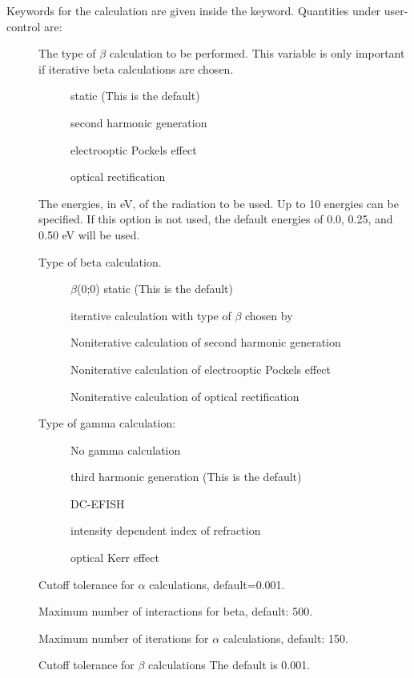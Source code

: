 Keywords for the  calculation are given inside the 
keyword.  Quantities under user-control are:
\begin{description}
\item[] The type of $\beta$ calculation to be performed.  
This variable is only important if iterative beta calculations are chosen.
\begin{description}
\item[] static (This is the default)
\item[] second harmonic generation
\item[] electrooptic Pockels effect
\item[] optical rectification
\end{description}
\item[] The energies, in eV, of 
the radiation to be used. Up to 10 energies can be specified.
If this option is not used, the default energies of 0.0, 0.25, and 0.50 eV will
be used.

\item[] Type of beta calculation.
\begin{description}   
\item[] $\beta$(0;0) static (This is the default)
\item[] iterative calculation with type of $\beta$ chosen by 
\item[] Noniterative calculation of second harmonic generation
\item[] Noniterative calculation of electrooptic Pockels effect
\item[] Noniterative calculation of optical rectification
\end{description}
\item[] Type of gamma calculation:
\begin{description}
\item[] No gamma calculation
\item[] third harmonic generation (This is the default)
\item[] DC-EFISH
\item[] intensity dependent index of refraction
\item[] optical Kerr effect
\end{description}
\item[] Cutoff tolerance for $\alpha$ calculations, 
default=0.001.
\item[] Maximum number of interactions for beta, default:
500.
\item[] Maximum number of iterations for $\alpha$
calculations, default: 150.
\item[]  Cutoff tolerance for $\beta$ calculations
The default is 0.001.
\end{description}


